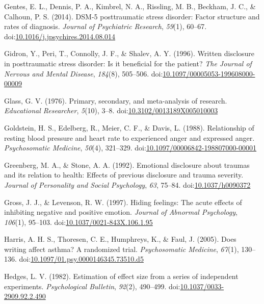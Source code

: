 \documentclass[english,man, mask]{apa6}
\theoremstyle{definition}
\theoremstyle{definition}
\theoremstyle{definition}
\theoremstyle{remark}
\begin{document}
\hypertarget{ref-Gentes2014}{}
Gentes, E. L., Dennis, P. A., Kimbrel, N. A., Rissling, M. B., Beckham,
J. C., \& Calhoun, P. S. (2014). DSM-5 posttraumatic stress disorder:
Factor structure and rates of diagnosis. \emph{Journal of Psychiatric
Research}, \emph{59}(1), 60--67.
doi:\href{https://doi.org/10.1016/j.jpsychires.2014.08.014}{10.1016/j.jpsychires.2014.08.014}

\hypertarget{ref-Gidron1996a}{}
Gidron, Y., Peri, T., Connolly, J. F., \& Shalev, A. Y. (1996). Written
disclosure in posttraumatic stress disorder: Is it beneficial for the
patient? \emph{The Journal of Nervous and Mental Disease},
\emph{184}(8), 505--506.
doi:\href{https://doi.org/10.1097/00005053-199608000-00009}{10.1097/00005053-199608000-00009}

\hypertarget{ref-Glass1976}{}
Glass, G. V. (1976). Primary, secondary, and meta-analysis of research.
\emph{Educational Researcher}, \emph{5}(10), 3--8.
doi:\href{https://doi.org/10.3102/0013189X005010003}{10.3102/0013189X005010003}

\hypertarget{ref-Goldstein1988}{}
Goldstein, H. S., Edelberg, R., Meier, C. F., \& Davis, L. (1988).
Relationship of resting blood pressure and heart rate to experienced
anger and expressed anger. \emph{Psychosomatic Medicine}, \emph{50}(4),
321--329.
doi:\href{https://doi.org/10.1097/00006842-198807000-00001}{10.1097/00006842-198807000-00001}

\hypertarget{ref-Greenberg1992}{}
Greenberg, M. A., \& Stone, A. A. (1992). Emotional disclosure about
traumas and its relation to health: Effects of previous disclosure and
trauma severity. \emph{Journal of Personality and Social Psychology},
\emph{63}, 75--84.
doi:\href{https://doi.org/10.1037/h0090372}{10.1037/h0090372}

\hypertarget{ref-Gross1997}{}
Gross, J. J., \& Levenson, R. W. (1997). Hiding feelings: The acute
effects of inhibiting negative and positive emotion. \emph{Journal of
Abnormal Psychology}, \emph{106}(1), 95--103.
doi:\href{https://doi.org/10.1037/0021-843X.106.1.95}{10.1037/0021-843X.106.1.95}

\hypertarget{ref-Harris2005}{}
Harris, A. H. S., Thoresen, C. E., Humphreys, K., \& Faul, J. (2005).
Does writing affect asthma? A randomized trial. \emph{Psychosomatic
Medicine}, \emph{67}(1), 130--136.
doi:\href{https://doi.org/10.1097/01.psy.0000146345.73510.d5}{10.1097/01.psy.0000146345.73510.d5}

\hypertarget{ref-Hedges1982}{}
Hedges, L. V. (1982). Estimation of effect size from a series of
independent experiments. \emph{Psychological Bulletin}, \emph{92}(2),
490--499.
doi:\href{https://doi.org/10.1037/0033-2909.92.2.490}{10.1037/0033-2909.92.2.490}
\end{document}
